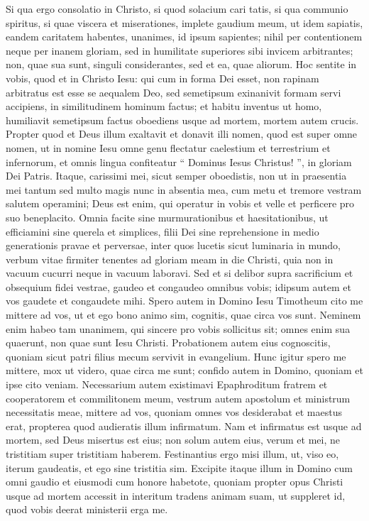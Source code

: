 \begin{biblechapter}
\begin{biblechapter}
\verse Si qua ergo consolatio in Christo, si quod solacium cari tatis, si qua communio spiritus, si quae viscera et miserationes, 
\verse implete gaudium meum, ut idem sapiatis, eandem caritatem habentes, unanimes, id ipsum sapientes; 
\verse nihil per contentionem neque per inanem gloriam, sed in humilitate superiores sibi invicem arbitrantes; 
\verse non, quae sua sunt, singuli considerantes, sed et ea, quae aliorum.
 \verse Hoc sentite in vobis, quod et in Christo Iesu:
 \verse qui cum in forma Dei esset,
 non rapinam arbitratus est esse se aequalem Deo,
 \verse sed semetipsum exinanivit formam servi accipiens,
 in similitudinem hominum factus;
 et habitu inventus ut homo,
 \verse humiliavit semetipsum factus oboediens usque ad mortem,
 mortem autem crucis.
 \verse Propter quod et Deus illum exaltavit
 et donavit illi nomen,
 quod est super omne nomen,
 \verse ut in nomine Iesu omne genu flectatur
 caelestium et terrestrium et infernorum,
 \verse et omnis lingua confiteatur
 “ Dominus Iesus Christus! ”,
 in gloriam Dei Patris.
 \verse Itaque, carissimi mei, sicut semper oboedistis, non ut in praesentia mei tantum sed multo magis nunc in absentia mea, cum metu et tremore vestram salutem operamini; 
\verse Deus est enim, qui operatur in vobis et velle et perficere pro suo beneplacito. 
\verse Omnia facite sine murmurationibus et haesitationibus, 
 \verse ut efficiamini sine querela et simplices, filii Dei sine reprehensione in medio generationis pravae et perversae, inter quos lucetis sicut luminaria in mundo, 
\verse verbum vitae firmiter tenentes ad gloriam meam in die Christi, quia non in vacuum cucurri neque in vacuum laboravi. 
\verse Sed et si delibor supra sacrificium et obsequium fidei vestrae, gaudeo et congaudeo omnibus vobis; 
 \verse idipsum autem et vos gaudete et congaudete mihi. 
\verse Spero autem in Domino Iesu Timotheum cito me mittere ad vos, ut et ego bono animo sim, cognitis, quae circa vos sunt. 
\verse Neminem enim habeo tam unanimem, qui sincere pro vobis sollicitus sit; 
\verse omnes enim sua quaerunt, non quae sunt Iesu Christi. 
 \verse Probationem autem eius cognoscitis, quoniam sicut patri filius mecum servivit in evangelium. 
\verse Hunc igitur spero me mittere, mox ut videro, quae circa me sunt; 
\verse confido autem in Domino, quoniam et ipse cito veniam.
 \verse Necessarium autem existimavi Epaphroditum fratrem et cooperatorem et commilitonem meum, vestrum autem apostolum et ministrum necessitatis meae, mittere ad vos, 
\verse quoniam omnes vos desiderabat et maestus erat, propterea quod audieratis illum infirmatum. 
\verse Nam et infirmatus est usque ad mortem, sed Deus misertus est eius; non solum autem eius, verum et mei, ne tristitiam super tristitiam haberem. 
\verse Festinantius ergo misi illum, ut, viso eo, iterum gaudeatis, et ego sine tristitia sim. 
\verse Excipite itaque illum in Domino cum omni gaudio et eiusmodi cum honore habetote, 
\verse quoniam propter opus Christi usque ad mortem accessit in interitum tradens animam suam, ut suppleret id, quod vobis deerat ministerii erga me.
 

\end{biblechapter}
\end{biblechapter}
